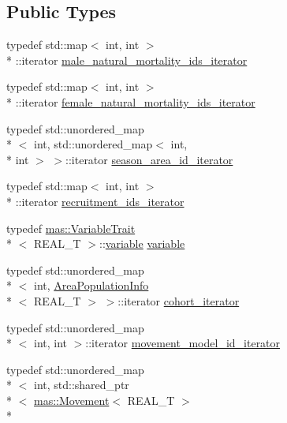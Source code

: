 \subsection*{Public Types}
\begin{DoxyCompactItemize}
\item 
typedef std\-::map$<$ int, int $>$\\*
\-::iterator \hyperlink{classmas_1_1_population_aed3c87441d95effcc96071a1ac6ad69c}{male\-\_\-natural\-\_\-mortality\-\_\-ids\-\_\-iterator}
\item 
typedef std\-::map$<$ int, int $>$\\*
\-::iterator \hyperlink{classmas_1_1_population_a96fc8c402905ebb808d78ae6c61953c9}{female\-\_\-natural\-\_\-mortality\-\_\-ids\-\_\-iterator}
\item 
typedef std\-::unordered\-\_\-map\\*
$<$ int, std\-::unordered\-\_\-map$<$ int, \\*
int $>$ $>$\-::iterator \hyperlink{classmas_1_1_population_ab971002bd0166bba55d86c73fd92d46a}{season\-\_\-area\-\_\-id\-\_\-iterator}
\item 
typedef std\-::map$<$ int, int $>$\\*
\-::iterator \hyperlink{classmas_1_1_population_a0aaaac61b68d5d8aa0e385067e05283c}{recruitment\-\_\-ids\-\_\-iterator}
\item 
typedef \hyperlink{structmas_1_1_variable_trait}{mas\-::\-Variable\-Trait}\\*
$<$ R\-E\-A\-L\-\_\-\-T $>$\-::\hyperlink{classmas_1_1_population_a55b9219455246e0cab7f84ae49f0271f}{variable} \hyperlink{classmas_1_1_population_a55b9219455246e0cab7f84ae49f0271f}{variable}
\item 
typedef std\-::unordered\-\_\-map\\*
$<$ int, \hyperlink{structmas_1_1_area_population_info}{Area\-Population\-Info}\\*
$<$ R\-E\-A\-L\-\_\-\-T $>$ $>$\-::iterator \hyperlink{classmas_1_1_population_a82c4fbea27716a8e9e64a34cf867ad43}{cohort\-\_\-iterator}
\item 
typedef std\-::unordered\-\_\-map\\*
$<$ int, int $>$\-::iterator \hyperlink{classmas_1_1_population_a60d48584943ae2846d15045f7696aafb}{movement\-\_\-model\-\_\-id\-\_\-iterator}
\item 
typedef std\-::unordered\-\_\-map\\*
$<$ int, std\-::shared\-\_\-ptr\\*
$<$ \hyperlink{structmas_1_1_movement}{mas\-::\-Movement}$<$ R\-E\-A\-L\-\_\-\-T $>$\\*

\end{DoxyCompactItemize}
